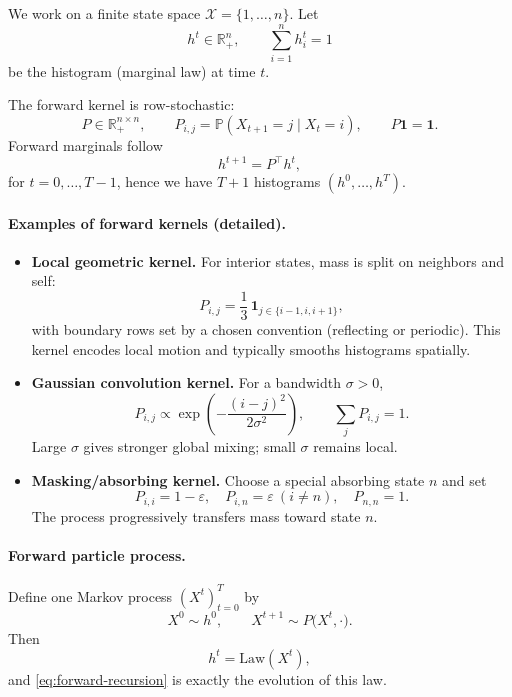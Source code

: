 \documentclass[11pt]{article}
\newcommand{\ones}{\mathbf{1}}
\begin{document}
We work on a finite state space $\mathcal{X}=\{1,\dots,n\}$. Let
\[
h^t\in\mathbb{R}_+^n,\qquad \sum_{i=1}^n h_i^t=1
\]
be the histogram (marginal law) at time $t$.

The forward kernel is row-stochastic:
\[
P\in\mathbb{R}_+^{n\times n},\qquad P_{i,j}=\mathbb{P}(X_{t+1}=j\mid X_t=i),\qquad P\ones=\ones.
\]
Forward marginals follow
\begin{equation}
\label{eq:forward-recursion}
h^{t+1}=P^\top h^t,
\end{equation}
for $t=0,\dots,T-1$, hence we have $T+1$ histograms $(h^0,\dots,h^T)$.

\paragraph{Examples of forward kernels (detailed).}
\begin{itemize}
\item \textbf{Local geometric kernel.}
For interior states, mass is split on neighbors and self:
\[
P_{i,j}=\frac13\,\mathbf{1}_{j\in\{i-1,i,i+1\}},
\]
with boundary rows set by a chosen convention (reflecting or periodic).
This kernel encodes local motion and typically smooths histograms spatially.

\item \textbf{Gaussian convolution kernel.}
For a bandwidth $\sigma>0$,
\[
P_{i,j}\propto \exp\!\left(-\frac{(i-j)^2}{2\sigma^2}\right),
\qquad
\sum_j P_{i,j}=1.
\]
Large $\sigma$ gives stronger global mixing; small $\sigma$ remains local.

\item \textbf{Masking/absorbing kernel.}
Choose a special absorbing state $n$ and set
\[
P_{i,i}=1-\varepsilon,\quad P_{i,n}=\varepsilon\ (i\neq n),\quad P_{n,n}=1.
\]
The process progressively transfers mass toward state $n$.
\end{itemize}

\paragraph{Forward particle process.}
Define one Markov process $(X^t)_{t=0}^T$ by
\[
X^0\sim h^0,
\qquad
X^{t+1}\sim P\big(X^t,\cdot\big).
\]
Then
\[
h^t=\mathrm{Law}(X^t),
\]
and \eqref{eq:forward-recursion} is exactly the evolution of this law.
\end{document}
